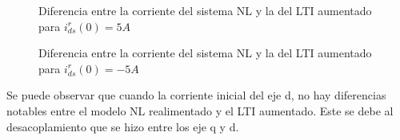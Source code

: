 \documentclass[a4paper, 10pt, onecolumn,journal]{ieeeconf}
\begin{document}
\begin{figure}[H]
	\centering
	\begin{adjustbox}{max width=\columnwidth}
	\end{adjustbox}
	\caption{Diferencia entre la corriente del sistema NL y la del LTI aumentado para $i^r_{ds}(0) = 5A $}
	\label{Diferencia entre la corriente del sistema NL y la del LTI aumentado para $i^r_{ds}(0) = 5A $}
\end{figure}

\begin{figure}[H]
	\centering
	\begin{adjustbox}{max width=\columnwidth}
	\end{adjustbox}
	\caption{Diferencia entre la corriente del sistema NL y la del LTI aumentado para $i^r_{ds}(0) = -5A $}
	\label{Diferencia entre la corriente del sistema NL y la del LTI aumentado para $i^r_{ds}(0) = -5A $}
\end{figure}
Se puede observar que cuando la corriente inicial del eje d, no hay diferencias notables entre el modelo NL realimentado y el LTI aumentado. Este se debe al desacoplamiento que se hizo entre los eje q y d.
\end{document}
